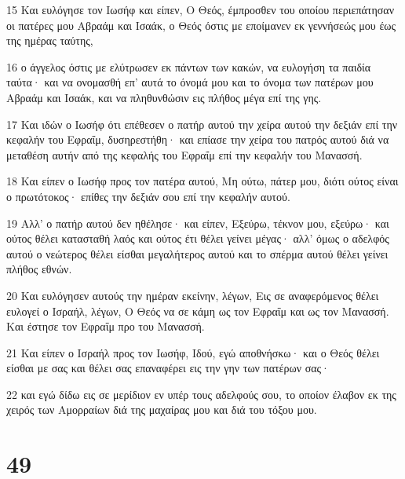 \par 15 Και ευλόγησε τον Ιωσήφ και είπεν, Ο Θεός, έμπροσθεν του οποίου περιεπάτησαν οι πατέρες μου Αβραάμ και Ισαάκ, ο Θεός όστις με εποίμανεν εκ γεννήσεώς μου έως της ημέρας ταύτης,
\par 16 ο άγγελος όστις με ελύτρωσεν εκ πάντων των κακών, να ευλογήση τα παιδία ταύτα· και να ονομασθή επ' αυτά το όνομά μου και το όνομα των πατέρων μου Αβραάμ και Ισαάκ, και να πληθυνθώσιν εις πλήθος μέγα επί της γης.
\par 17 Και ιδών ο Ιωσήφ ότι επέθεσεν ο πατήρ αυτού την χείρα αυτού την δεξιάν επί την κεφαλήν του Εφραΐμ, δυσηρεστήθη· και επίασε την χείρα του πατρός αυτού διά να μεταθέση αυτήν από της κεφαλής του Εφραΐμ επί την κεφαλήν του Μανασσή.
\par 18 Και είπεν ο Ιωσήφ προς τον πατέρα αυτού, Μη ούτω, πάτερ μου, διότι ούτος είναι ο πρωτότοκος· επίθες την δεξιάν σου επί την κεφαλήν αυτού.
\par 19 Αλλ' ο πατήρ αυτού δεν ηθέλησε· και είπεν, Εξεύρω, τέκνον μου, εξεύρω· και ούτος θέλει κατασταθή λαός και ούτος έτι θέλει γείνει μέγας· αλλ' όμως ο αδελφός αυτού ο νεώτερος θέλει είσθαι μεγαλήτερος αυτού και το σπέρμα αυτού θέλει γείνει πλήθος εθνών.
\par 20 Και ευλόγησεν αυτούς την ημέραν εκείνην, λέγων, Εις σε αναφερόμενος θέλει ευλογεί ο Ισραήλ, λέγων, Ο Θεός να σε κάμη ως τον Εφραΐμ και ως τον Μανασσή. Και έστησε τον Εφραΐμ προ του Μανασσή.
\par 21 Και είπεν ο Ισραήλ προς τον Ιωσήφ, Ιδού, εγώ αποθνήσκω· και ο Θεός θέλει είσθαι με σας και θέλει σας επαναφέρει εις την γην των πατέρων σας·
\par 22 και εγώ δίδω εις σε μερίδιον εν υπέρ τους αδελφούς σου, το οποίον έλαβον εκ της χειρός των Αμορραίων διά της μαχαίρας μου και διά του τόξου μου.

\chapter{49}

